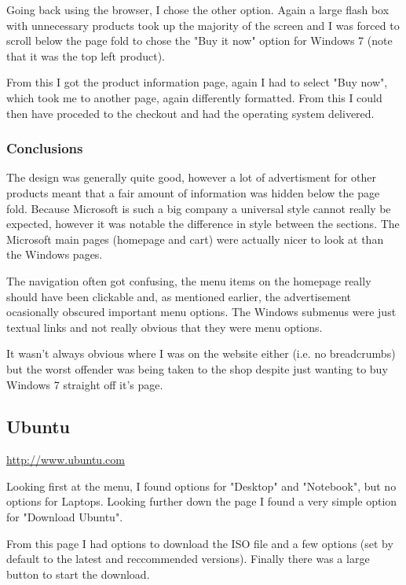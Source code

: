 \documentclass[10pt,letterpaper]{article}
\begin{document}
      Going back using the browser, I chose the other option. Again a large flash box with unnecessary products took up the majority of the screen and I was forced to scroll below the page fold to chose the "Buy it now" option for Windows 7 (note that it was the top left product).
      
      From this I got the product information page, again I had to select "Buy now", which took me to another page, again differently formatted. From this I could then have proceded to the checkout and had the operating system delivered.
      
      \subsubsection{Conclusions}
	The design was generally quite good, however a lot of advertisment for other products meant that a fair amount of information was hidden below the page fold.
	Because Microsoft is such a big company a universal style cannot really be expected, however it was notable the difference in style between the sections. The Microsoft main pages (homepage and cart) were actually nicer to look at than the Windows pages.
	
	The navigation often got confusing, the menu items on the homepage really should have been clickable and, as mentioned earlier, the advertisement ocasionally obscured important menu options. The Windows submenus were just textual links and not really obvious that they were menu options.
	
	It wasn't always obvious where I was on the website either (i.e. no breadcrumbs) but the worst offender was being taken to the shop despite just wanting to buy Windows 7 straight off it's page.
	
	
      
    \subsection{Ubuntu}
      \url{http://www.ubuntu.com}
      
      Looking first at the menu, I found options for "Desktop" and "Notebook", but no options for Laptops. Looking further down the page I found a very simple option for "Download Ubuntu".
      
      From this page I had options to download the ISO file and a few options (set by default to the latest and reccommended versions). Finally there was a large button to start the download.
      
\end{document}
